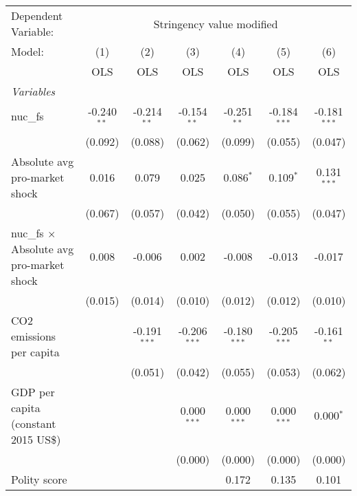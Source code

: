 
\begingroup
\centering
\begin{tabular}{lcccccc}
   \toprule
   Dependent Variable: & \multicolumn{6}{c}{Stringency value modified}\\
   Model:                                           & (1)           & (2)            & (3)            & (4)            & (5)            & (6)\\  
                                                    &  OLS          & OLS            & OLS            & OLS            & OLS            & OLS\\  
   \midrule
   \emph{Variables}\\
   nuc\_fs                                          & -0.240$^{**}$ & -0.214$^{**}$  & -0.154$^{**}$  & -0.251$^{**}$  & -0.184$^{***}$ & -0.181$^{***}$\\   
                                                    & (0.092)       & (0.088)        & (0.062)        & (0.099)        & (0.055)        & (0.047)\\   
   Absolute avg pro-market shock                    & 0.016         & 0.079          & 0.025          & 0.086$^{*}$    & 0.109$^{*}$    & 0.131$^{***}$\\   
                                                    & (0.067)       & (0.057)        & (0.042)        & (0.050)        & (0.055)        & (0.047)\\   
   nuc\_fs $\times$ Absolute avg pro-market shock   & 0.008         & -0.006         & 0.002          & -0.008         & -0.013         & -0.017\\   
                                                    & (0.015)       & (0.014)        & (0.010)        & (0.012)        & (0.012)        & (0.010)\\   
   CO2 emissions per capita                         &               & -0.191$^{***}$ & -0.206$^{***}$ & -0.180$^{***}$ & -0.205$^{***}$ & -0.161$^{**}$\\   
                                                    &               & (0.051)        & (0.042)        & (0.055)        & (0.053)        & (0.062)\\   
   GDP per capita (constant 2015 US\$)              &               &                & 0.000$^{***}$  & 0.000$^{***}$  & 0.000$^{***}$  & 0.000$^{*}$\\   
                                                    &               &                & (0.000)        & (0.000)        & (0.000)        & (0.000)\\   
   Polity score                                     &               &                &                & 0.172          & 0.135          & 0.101\\   

\end{tabular}
